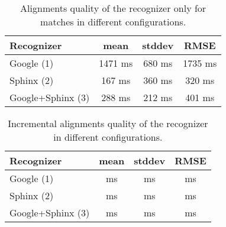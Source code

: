 \begin {table}
\label{tab:alignment_non_increm_ms} 
\begin{center}
\caption {Alignments quality of the recognizer only for matches 
in different configurations.}
    \begin{tabular}{l  c  c  c }
   \toprule
    Recognizer & mean & stddev & RMSE \\ \toprule
    Google (1)  & 1471 ms & 680 ms & 1735 ms \\ 
    Sphinx (2)  & 167 ms & 360 ms & 320 ms \\ 
    Google+Sphinx (3)  & 288 ms &  212 ms &  401 ms \\ 
    \end{tabular}
\end{center}
\end {table}
\begin {table}
\label{tab:alignment_non_incr_m} 
\begin{center}
\caption {Incremental alignments quality of the recognizer in different
configurations.}
    \begin{tabular}{ l  c  c  c }
    \toprule
    Recognizer & mean  & stddev & RMSE\\ \toprule
    Google (1)  & ms & ms & ms \\ 
    Sphinx (2)  & ms & ms & ms \\ 
    Google+Sphinx (3)  & ms & ms & ms \\ 
    \bottomrule  
    \end{tabular}
\end{center}
\end {table}
